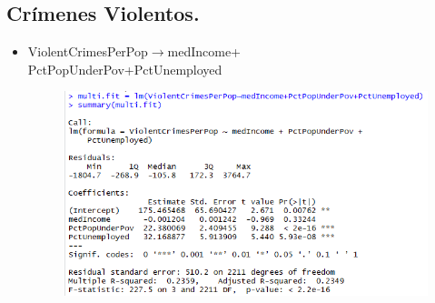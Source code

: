 \documentclass[a4paper,10pt,twocolumn]{article}
\begin{document}
\subsection*{Crímenes Violentos.}
\begin{itemize}
	\item {ViolentCrimesPerPop$\rightarrow$medIncome+ \\ PctPopUnderPov+PctUnemployed}






		\begin{figure}[H]
			\begin{center}
				\includegraphics[width=.92\columnwidth,right]{figures/multifit1.png}
			\end{center}
		\end{figure}


\end{itemize}
\end{document}
